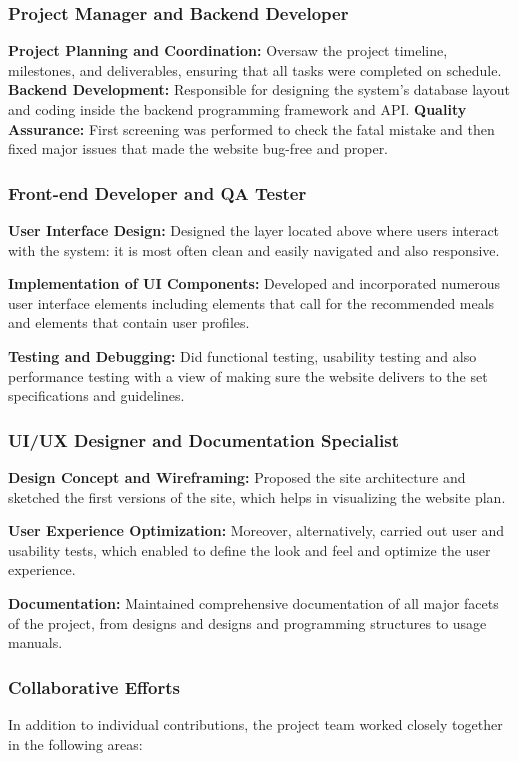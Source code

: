 \documentclass[a4paper,12pt]{article}
\begin{document}
\subsubsection{Project Manager and Backend Developer}
\textbf{Project Planning and Coordination:} Oversaw the project timeline, milestones, and deliverables, ensuring that all tasks were completed on schedule.
\textbf{Backend Development:} Responsible for designing the system’s database layout and coding inside the backend programming framework and API.
\textbf{Quality Assurance:} First screening was performed to check the fatal mistake and then fixed major issues that made the website bug-free and proper.


\subsubsection{Front-end Developer and QA Tester}
\textbf{User Interface Design:} Designed the layer located above where users interact with the system: it is most often clean and easily navigated and also responsive.

\noindent\textbf{Implementation of UI Components:} Developed and incorporated numerous user interface elements including elements that call for the recommended meals and elements that contain user profiles.

\noindent\textbf{Testing and Debugging:} Did functional testing, usability testing and also performance testing with a view of making sure the website delivers to the set specifications and guidelines.


\subsubsection{UI/UX Designer and Documentation Specialist}
\textbf{Design Concept and Wireframing:} Proposed the site architecture and sketched the first versions of the site, which helps in visualizing the website plan.

\noindent\textbf{User Experience Optimization:} Moreover, alternatively, carried out user and usability tests, which enabled to define the look and feel and optimize the user experience.

\noindent\textbf{Documentation:} Maintained comprehensive documentation of all major facets of the project, from designs and designs and programming structures to usage manuals.


\noindent\subsubsection{Collaborative Efforts}
In addition to individual contributions, the project team worked closely together in the following areas:
 
\end{document}
